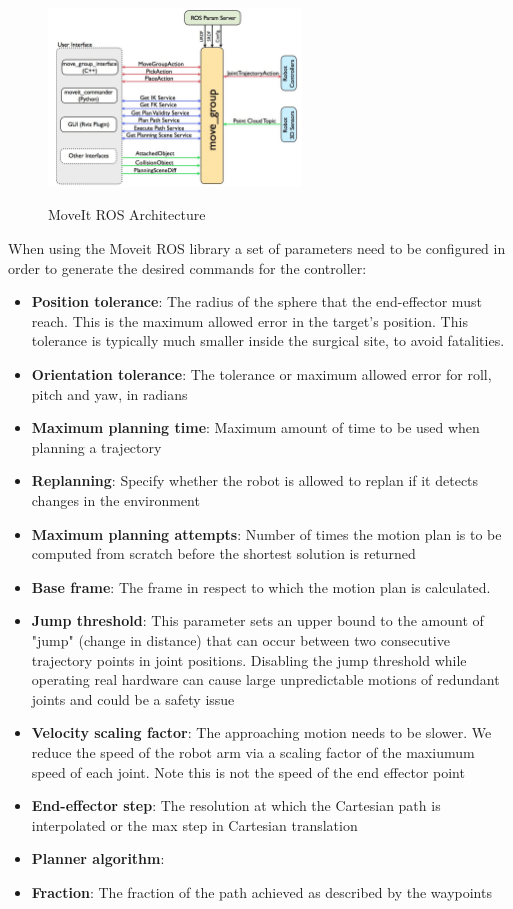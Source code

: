 \begin{center}
\begin{figure}[H]
\centering
\includegraphics[width=0.6\textwidth]{images/moveit_move_group.png}\\
\caption{MoveIt ROS Architecture}
\end{figure}
\end{center}

When using the Moveit ROS library a set of parameters need to be configured in order to generate the desired commands for the controller:
\begin{itemize}
	\item \textbf{Position tolerance}: The radius of the sphere that the end-effector must reach. This is the maximum allowed error in the target's position.
	This tolerance is typically much smaller inside the surgical site, to avoid fatalities.
	\item \textbf{Orientation tolerance}: The tolerance or maximum allowed error for roll, pitch and yaw, in radians
	\item \textbf{Maximum planning time}: Maximum amount of time to be used when planning a trajectory
	\item \textbf{Replanning}: Specify whether the robot is allowed to replan if it detects changes in the environment
	\item \textbf{Maximum planning attempts}: Number of times the motion plan is to be computed from scratch before the shortest solution is returned
	\item \textbf{Base frame}: The frame in respect to which the motion plan is calculated.
	\item \textbf{Jump threshold}: This parameter sets an upper bound to the amount of "jump" (change in distance) that can occur between two consecutive trajectory points in joint 
	positions. Disabling the jump threshold while operating real hardware can cause large unpredictable motions of redundant joints 
	and could be a safety issue
	\item \textbf{Velocity scaling factor}: The approaching motion needs to be slower. We reduce the speed of the robot arm via a scaling factor of the 
	maxiumum speed of each joint. Note this is not the speed of the end effector point
	\item \textbf{End-effector step}: The resolution at which the Cartesian path is interpolated or the max step in Cartesian translation
	\item \textbf{Planner algorithm}:
	\item \textbf{Fraction}: The fraction of the path achieved as described by the waypoints
\end{itemize}

